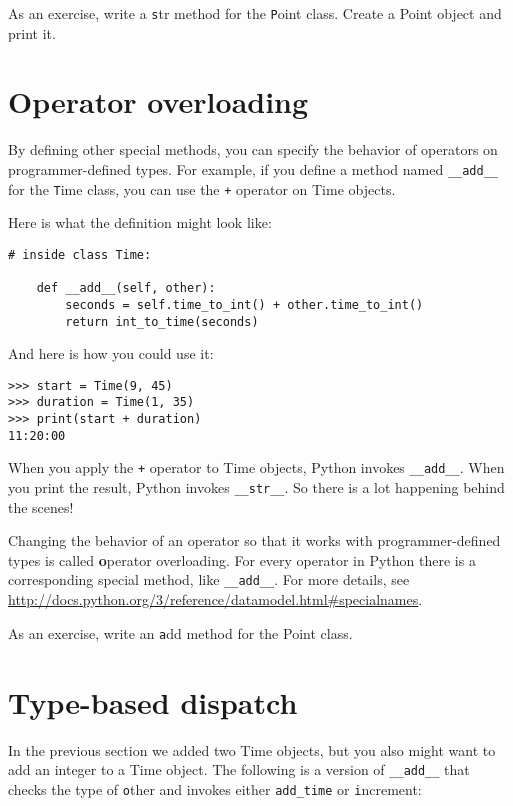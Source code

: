 \documentclass[
DIV=11,
fontsize=13,
twoside,
headinclude=false,
titlepage=firstiscover,
abstract=true,
headsepline=true,
footsepline=true,
chapterprefix=true, %
headings=big,
bibliography=totoc,%
captions=tableheading
]{scrbook}
\theoremstyle{definition}
\begin{document}
As an exercise, write a {\texttt str} method for the {\texttt Point} class.
Create a Point object and print it.


\section{Operator overloading}
\label{operator.overloading}

By defining other special methods, you can specify the behavior
of operators on programmer-defined types.  For example, if you define
a method named \verb"__add__" for the {\texttt Time} class, you can use the
{\texttt +} operator on Time objects.

Here is what the definition might look like:

\begin{lstlisting}
# inside class Time:

    def __add__(self, other):
        seconds = self.time_to_int() + other.time_to_int()
        return int_to_time(seconds)
\end{lstlisting}
%
And here is how you could use it:

\begin{lstlisting}
>>> start = Time(9, 45)
>>> duration = Time(1, 35)
>>> print(start + duration)
11:20:00
\end{lstlisting}
%
When you apply the {\texttt +} operator to Time objects, Python invokes
\verb"__add__".  When you print the result, Python invokes 
\verb"__str__".  So there is a lot happening behind the scenes!

Changing the behavior of an operator so that it works with
programmer-defined types is called {\textbf operator overloading}.  For every
operator in Python there is a corresponding special method, like 
\verb"__add__".  For more details, see
\url{http://docs.python.org/3/reference/datamodel.html#specialnames}.

As an exercise, write an {\texttt add} method for the Point class.  


\section{Type-based dispatch}

In the previous section we added two Time objects, but you
also might want to add an integer to a Time object.  The
following is a version of \verb"__add__"
that checks the type of {\texttt other} and invokes either
\verb"add_time" or {\texttt increment}:
\end{document}
